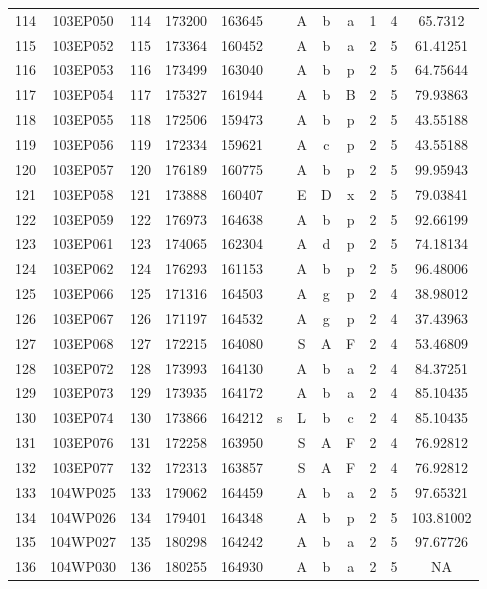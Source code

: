 \begin{tabular}{|*{12}{c|}}
114 & 103EP050 & 114 & 173200 & 163645 &  & A & b & a & 1 & 4 & 65.7312 \\ 
115 & 103EP052 & 115 & 173364 & 160452 &  & A & b & a & 2 & 5 & 61.41251 \\ 
116 & 103EP053 & 116 & 173499 & 163040 &  & A & b & p & 2 & 5 & 64.75644 \\ 
117 & 103EP054 & 117 & 175327 & 161944 &  & A & b & B & 2 & 5 & 79.93863 \\ 
118 & 103EP055 & 118 & 172506 & 159473 &  & A & b & p & 2 & 5 & 43.55188 \\ 
119 & 103EP056 & 119 & 172334 & 159621 &  & A & c & p & 2 & 5 & 43.55188 \\ 
120 & 103EP057 & 120 & 176189 & 160775 &  & A & b & p & 2 & 5 & 99.95943 \\ 
121 & 103EP058 & 121 & 173888 & 160407 &  & E & D & x & 2 & 5 & 79.03841 \\ 
122 & 103EP059 & 122 & 176973 & 164638 &  & A & b & p & 2 & 5 & 92.66199 \\ 
123 & 103EP061 & 123 & 174065 & 162304 &  & A & d & p & 2 & 5 & 74.18134 \\ 
124 & 103EP062 & 124 & 176293 & 161153 &  & A & b & p & 2 & 5 & 96.48006 \\ 
125 & 103EP066 & 125 & 171316 & 164503 &  & A & g & p & 2 & 4 & 38.98012 \\ 
126 & 103EP067 & 126 & 171197 & 164532 &  & A & g & p & 2 & 4 & 37.43963 \\ 
127 & 103EP068 & 127 & 172215 & 164080 &  & S & A & F & 2 & 4 & 53.46809 \\ 
128 & 103EP072 & 128 & 173993 & 164130 &  & A & b & a & 2 & 4 & 84.37251 \\ 
129 & 103EP073 & 129 & 173935 & 164172 &  & A & b & a & 2 & 4 & 85.10435 \\ 
130 & 103EP074 & 130 & 173866 & 164212 & s & L & b & c & 2 & 4 & 85.10435 \\ 
131 & 103EP076 & 131 & 172258 & 163950 &  & S & A & F & 2 & 4 & 76.92812 \\ 
132 & 103EP077 & 132 & 172313 & 163857 &  & S & A & F & 2 & 4 & 76.92812 \\ 
133 & 104WP025 & 133 & 179062 & 164459 &  & A & b & a & 2 & 5 & 97.65321 \\ 
134 & 104WP026 & 134 & 179401 & 164348 &  & A & b & p & 2 & 5 & 103.81002 \\ 
135 & 104WP027 & 135 & 180298 & 164242 &  & A & b & a & 2 & 5 & 97.67726 \\ 
136 & 104WP030 & 136 & 180255 & 164930 &  & A & b & a & 2 & 5 & NA \\ 

\end{tabular}
